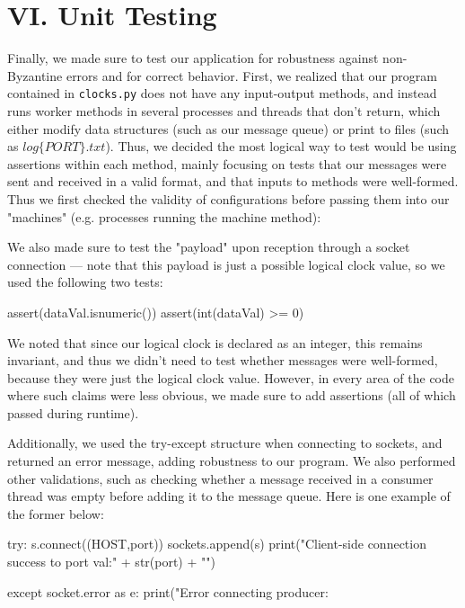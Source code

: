 \documentclass[
	a4paper, %
	10pt, %
	unnumberedsections, %
	twoside, %
]{LTJournalArticle}
\begin{document}
\section{VI. Unit Testing}
Finally, we made sure to test our application for robustness against non-Byzantine errors and for correct behavior. First, we realized that our program contained in \texttt{clocks.py} does not have any input-output methods, and instead runs worker methods in several processes and threads that don't return, which either modify data structures (such as our message queue) or print to files (such as $log\{PORT\}.txt$). Thus, we decided the most logical way to test would be using assertions within each method, mainly focusing on tests that our messages were sent and received in a valid format, and that inputs to methods were well-formed. Thus we first checked the validity of configurations before passing them into our "machines" (e.g. processes running the machine method):

We also made sure to test the "payload" upon reception through a socket connection --- note that this payload is just a possible logical clock value, so we used the following two tests:
\begin{python}
	assert(dataVal.isnumeric())
	assert(int(dataVal) >= 0)
\end{python}

We noted that since our logical clock is declared as an integer, this remains invariant, and thus we didn't need to test whether messages were well-formed, because they were just the logical clock value. However, in every area of the code where such claims were less obvious, we made sure to add assertions (all of which passed during runtime). 

Additionally, we used the try-except structure when connecting to sockets, and returned an error message, adding robustness to our program. We also performed other validations, such as checking whether a message received in a consumer thread was empty before adding it to the message queue. Here is one example of the former below:
\begin{python}
try:
	s.connect((HOST,port))
	sockets.append(s)
	print("Client-side connection success 
			to port val:" + str(port) + "\n")

except socket.error as e:
	print("Error connecting producer: %
\end{python}
\end{document}

